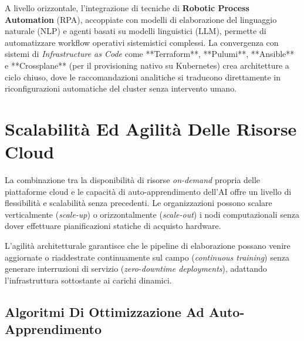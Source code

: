 \documentclass[11pt, a4paper]{article}
\begin{document}
A livello orizzontale, l'integrazione di tecniche di \textbf{Robotic Process Automation} (RPA), accoppiate con modelli di elaborazione del linguaggio naturale (NLP) e agenti basati su modelli linguistici (LLM), permette di automatizzare workflow operativi sistemistici complessi. La convergenza con sistemi di \emph{Infrastructure as Code} come **Terraform**, **Pulumi**, **Ansible** e **Crossplane** (per il provisioning nativo su Kubernetes) crea architetture a ciclo chiuso, dove le raccomandazioni analitiche si traducono direttamente in riconfigurazioni automatiche del cluster senza intervento umano.

\newpage


\section{Scalabilità Ed Agilità Delle Risorse Cloud}

La combinazione tra la disponibilità di risorse \emph{on-demand} propria delle piattaforme cloud e le capacità di auto-apprendimento dell'AI offre un livello di flessibilità e scalabilità senza precedenti. Le organizzazioni possono scalare verticalmente (\emph{scale-up}) o orizzontalmente (\emph{scale-out}) i nodi computazionali senza dover effettuare pianificazioni statiche di acquisto hardware.


L'agilità architetturale garantisce che le pipeline di elaborazione possano venire aggiornate o riaddestrate continuamente sul campo (\emph{continuous training}) senza generare interruzioni di servizio (\emph{zero-downtime deployments}), adattando l'infrastruttura sottostante ai carichi dinamici.


\subsection{Algoritmi Di Ottimizzazione Ad Auto-Apprendimento}
\end{document}
